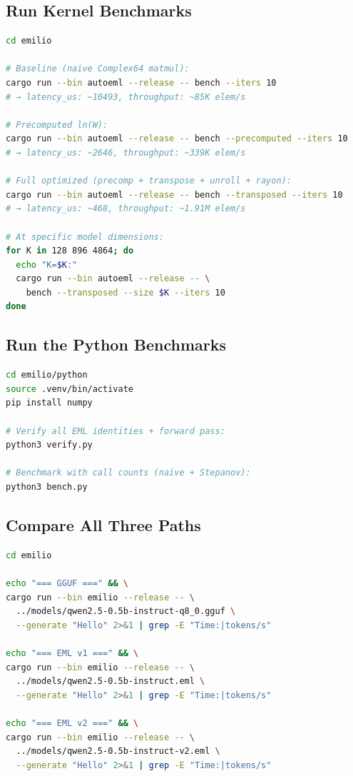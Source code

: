 \documentclass[acmsmall,nonacm]{acmart}
\begin{document}
\subsection{Run Kernel Benchmarks}

\begin{lstlisting}[language=bash,caption={autoeml kernel benchmarks.}]
cd emilio

# Baseline (naive Complex64 matmul):
cargo run --bin autoeml --release -- bench --iters 10
# → latency_us: ~10493, throughput: ~85K elem/s

# Precomputed ln(W):
cargo run --bin autoeml --release -- bench --precomputed --iters 10
# → latency_us: ~2646, throughput: ~339K elem/s

# Full optimized (precomp + transpose + unroll + rayon):
cargo run --bin autoeml --release -- bench --transposed --iters 10
# → latency_us: ~468, throughput: ~1.91M elem/s

# At specific model dimensions:
for K in 128 896 4864; do
  echo "K=$K:"
  cargo run --bin autoeml --release -- \
    bench --transposed --size $K --iters 10
done
\end{lstlisting}

\subsection{Run the Python Benchmarks}

\begin{lstlisting}[language=bash,caption={Python POC: verification and benchmarks.}]
cd emilio/python
source .venv/bin/activate
pip install numpy

# Verify all EML identities + forward pass:
python3 verify.py

# Benchmark with call counts (naive + Stepanov):
python3 bench.py
\end{lstlisting}

\subsection{Compare All Three Paths}

\begin{lstlisting}[language=bash,caption={Head-to-head comparison.}]
cd emilio

echo "=== GGUF ===" && \
cargo run --bin emilio --release -- \
  ../models/qwen2.5-0.5b-instruct-q8_0.gguf \
  --generate "Hello" 2>&1 | grep -E "Time:|tokens/s"

echo "=== EML v1 ===" && \
cargo run --bin emilio --release -- \
  ../models/qwen2.5-0.5b-instruct.eml \
  --generate "Hello" 2>&1 | grep -E "Time:|tokens/s"

echo "=== EML v2 ===" && \
cargo run --bin emilio --release -- \
  ../models/qwen2.5-0.5b-instruct-v2.eml \
  --generate "Hello" 2>&1 | grep -E "Time:|tokens/s"
\end{lstlisting}
\end{document}
